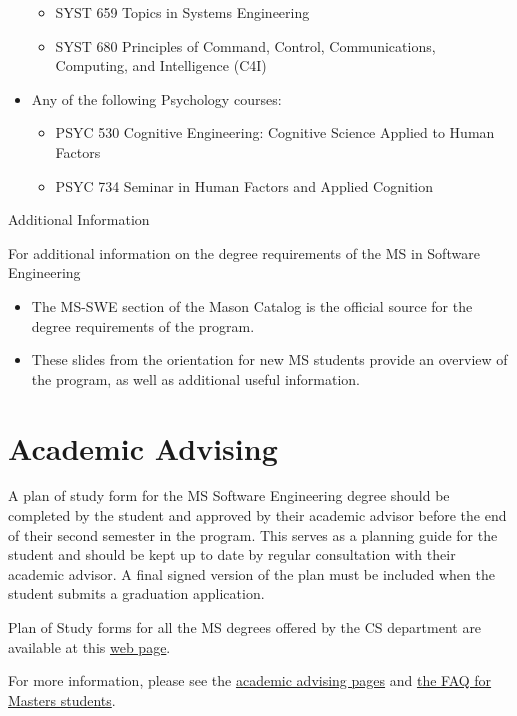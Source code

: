 \documentclass[oneside,11pt]{memoir}
\begin{document}
\begin{itemize}
\begin{itemize}
        \item SYST 659 Topics in Systems Engineering
        \item SYST 680 Principles of Command, Control, Communications, Computing, and Intelligence (C4I)
\end{itemize}        
    \item Any of the following Psychology courses:
    \begin{itemize}
        \item PSYC 530 Cognitive Engineering: Cognitive Science Applied to Human Factors
        \item PSYC 734 Seminar in Human Factors and Applied Cognition
\end{itemize}        
\end{itemize}
Additional Information

For additional information on the degree requirements of the MS in Software Engineering
\begin{itemize}
    \item The MS-SWE section of the Mason Catalog is the official source for the degree requirements of the program.
    \item These slides from the orientation for new MS students provide an overview of the program, as well as additional useful information.
\end{itemize}

\section{Academic Advising}

A plan of study form for the MS Software Engineering degree should be completed by the student and approved by their academic advisor before the end of their second semester in the program. This serves as a planning guide for the student and should be kept up to date by regular consultation with their academic advisor. A final signed version of the plan must be included when the student submits a graduation application.

Plan of Study forms for all the MS degrees offered by the CS department are available at this \href{https://cs.gmu.edu/resources/student-forms/}{web page}.

For more information, please see the \href{https://cs.gmu.edu/current-students/ms-students/advising/}{academic advising pages} and \href{https://cs.gmu.edu/current-students/ms-students/faqs/}{the FAQ for Masters students}.
\end{document}
